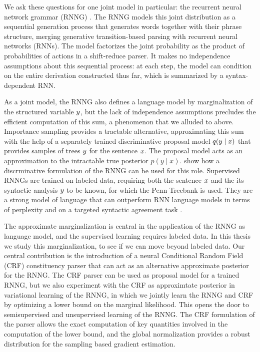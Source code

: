   We ask these questions for one joint model in particular: the recurrent neural network grammar (RNNG) \citep{dyer2016rnng}. The RNNG models this joint distribution as a sequential generation process that generates words together with their phrase structure, merging generative transition-based parsing with recurrent neural networks (RNNs). The model factorizes the joint probability as the product of probabilities of actions in a shift-reduce parser. It makes no independence assumptions about this sequential process: at each step, the model can condition on the entire derivation constructed thus far, which is summarized by a syntax-dependent RNN.

  As a joint model, the RNNG also defines a language model by marginalization of the structured variable $y$, but the lack of independence assumptions precludes the efficient computation of this sum, a phenomenon that we alluded to above. Importance sampling provides a tractable alternative, approximating this sum with the help of a separately trained discriminative proposal model $q(y \mid x)$ that provides samples of trees $y$ for the sentence $x$. The proposal model acts as an approximation to the intractable true posterior $p(y \mid x)$. \citet{dyer2016rnng} show how a discrminative formulation of the RNNG can be used for this role. Supervised RNNGs are trained on labeled data, requiring both the sentence $x$ and the its syntactic analysis $y$ to be known, for which the Penn Treebank \citep{marcus1993penn} is used. They are a strong model of language that can outperform RNN language models in terms of perplexity \citep{dyer2016rnng} and on a targeted syntactic agreement task \citep{kuncoro2018learn}.

  The approximate marginalization is central in the application of the RNNG as language model, and the supervised learning requires labeled data. In this thesis we study this marginalization, to see if we can move beyond labeled data. Our central contribution is the introduction of a neural Conditional Random Field (CRF) constituency parser that can act as an alternative approximate posterior for the RNNG. The CRF parser can be used as proposal model for a trained RNNG, but we also experiment with the CRF as approximtate posterior in variational learning of the RNNG, in which we jointly learn the RNNG and CRF by optimizing a lower bound on the marginal likelihood. This opens the door to semisupervised and unsupervised learning of the RNNG. The CRF formulation of the parser allows the exact computation of key quantities involved in the computation of the lower bound, and the global normalization provides a robust distribution for the sampling based gradient estimation.

